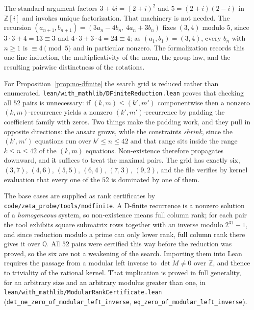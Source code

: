 \documentclass[11pt]{article}
\theoremstyle{plain}
\theoremstyle{definition}
\theoremstyle{remark}
\begin{document}
The standard argument factors $3+4i = (2+i)^2$ and $5 = (2+i)(2-i)$ in $\mathbb{Z}[i]$ and
invokes unique factorization. That machinery is not needed. The recursion
$(a_{n+1}, b_{n+1}) = (3a_n - 4b_n,\, 4a_n + 3b_n)$ fixes $(3,4)$ modulo $5$, since
$3 \cdot 3 + 4 = 13 \equiv 3$ and $4 \cdot 3 + 3 \cdot 4 = 24 \equiv 4$; as $(a_1,b_1) = (3,4)$,
every $b_n$ with $n \ge 1$ is $\equiv 4 \pmod 5$ and in particular nonzero. The formalization
records this one-line induction, the multiplicativity of the norm, the group law, and the
resulting pairwise distinctness of the rotations.

For Proposition~\ref{prop:no-dfinite} the search grid is reduced rather than enumerated.
\texttt{lean/with\_mathlib/DFiniteReduction.lean} proves that checking all $52$ pairs is
unnecessary: if
$(k,m) \le (k',m')$ componentwise then a nonzero $(k,m)$-recurrence yields a nonzero
$(k',m')$-recurrence by padding the coefficient family with zeros. Two things make the padding
work, and they pull in opposite directions: the ansatz grows, while the constraints
\emph{shrink}, since the $(k',m')$ equations run over $k' \le n \le 42$ and that range sits
inside the range $k \le n \le 42$ of the $(k,m)$ equations. Non-existence therefore propagates
downward, and it suffices to treat the maximal pairs. The grid has exactly six,
$(3,7)$, $(4,6)$, $(5,5)$, $(6,4)$, $(7,3)$, $(9,2)$, and the file verifies by kernel
evaluation that every one of the $52$ is dominated by one of them.

The base cases are supplied as rank certificates by
\texttt{code/zeta\_probe/tools/nodfinite}. A D-finite recurrence is a nonzero solution of a
\emph{homogeneous} system, so non-existence means full column rank; for each pair the tool
exhibits square submatrix rows together with an inverse modulo $2^{31}-1$, and since reduction
modulo a prime can only lower rank, full column rank there gives it over $\mathbb{Q}$. All
$52$ pairs were certified this way before the reduction was proved, so the six are not a
weakening of the search. Importing them into Lean requires the passage from a modular left
inverse to $\det M \neq 0$ over $\mathbb{Z}$, and thence to triviality of the rational kernel.
That implication is proved in full generality, for an arbitrary size and an arbitrary modulus
greater than one, in \texttt{lean/with\_mathlib/ModularRankCertificate.lean}
(\texttt{det\_ne\_zero\_of\_modular\_left\_inverse},
\texttt{eq\_zero\_of\_modular\_left\_inverse}).
\end{document}
